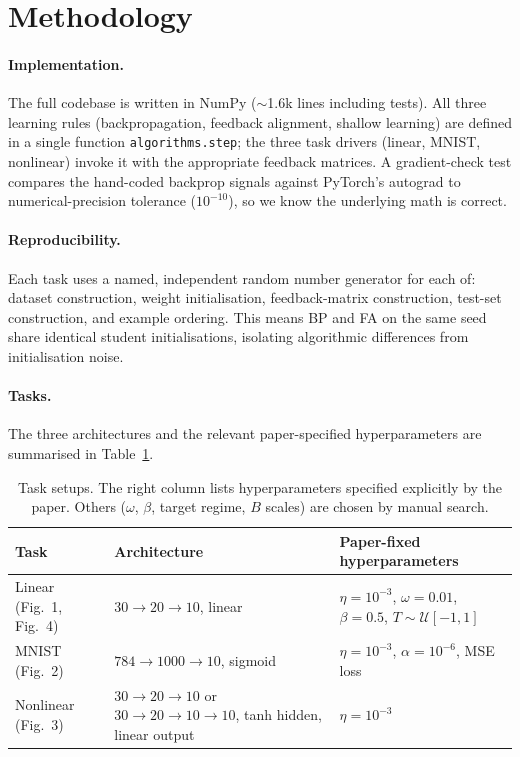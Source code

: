 \documentclass[11pt,a4paper]{article}
\begin{document}
\section{Methodology}

\paragraph{Implementation.} The full codebase is written in NumPy
($\sim$1.6k lines including tests). All three learning rules
(backpropagation, feedback alignment, shallow learning) are defined in a
single function \texttt{algorithms.step}; the three task drivers (linear,
MNIST, nonlinear) invoke it with the appropriate feedback matrices. A
gradient-check test compares the hand-coded backprop signals against
PyTorch's autograd to numerical-precision tolerance ($10^{-10}$), so we know
the underlying math is correct.

\paragraph{Reproducibility.} Each task uses a named, independent random
number generator for each of: dataset construction, weight initialisation,
feedback-matrix construction, test-set construction, and example ordering.
This means BP and FA on the same seed share identical student
initialisations, isolating algorithmic differences from initialisation
noise.

\paragraph{Tasks.} The three architectures and the relevant
paper-specified hyperparameters are summarised in Table~\ref{tab:setup}.

\begin{table}[h]
\centering
\caption{Task setups. The right column lists hyperparameters specified
explicitly by the paper. Others ($\omega$, $\beta$, target regime, $B$
scales) are chosen by manual search.}
\label{tab:setup}
\small
\begin{tabularx}{\linewidth}{l X X}
\toprule
Task & Architecture & Paper-fixed hyperparameters \\
\midrule
Linear (Fig.\ 1, Fig.\ 4) & $30 \to 20 \to 10$, linear & $\eta=10^{-3}$, $\omega=0.01$, $\beta=0.5$, $T \sim \mathcal{U}[-1,1]$ \\
MNIST (Fig.\ 2)           & $784 \to 1000 \to 10$, sigmoid & $\eta=10^{-3}$, $\alpha=10^{-6}$, MSE loss \\
Nonlinear (Fig.\ 3)       & $30 \to 20 \to 10$ or $30 \to 20 \to 10 \to 10$, tanh hidden, linear output & $\eta=10^{-3}$ \\
\bottomrule
\end{tabularx}
\end{table}
\end{document}
